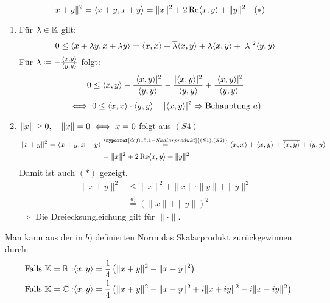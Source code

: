\begin{bemerkung*}
	\[ \| x + y \|^{2} = \langle x + y, x + y \rangle = \| x\|^{2} + 2 \mathop{\rm Re}\nolimits \langle x, y \rangle + \| y \|^{2} \quad (*) \label{eq:15.2-*} \]
\end{bemerkung*}

\begin{beweis}
	\begin{enumerate}[label=\alph*\upshape)]
		\item Für $\lambda \in \mathbb{K}$ gilt:
			\[ 0 \leq \langle x + \lambda y, x + \lambda y \rangle = \langle x, x \rangle + \overline{\lambda} \langle x, y \rangle + \lambda \langle x, y \rangle + |\lambda|^{2} \langle y, y \rangle \]
			Für $\lambda \coloneqq - \frac{\langle x, y \rangle}{\langle y, y \rangle}$ folgt:
			\[ 0 \leq \langle x, y \rangle - \frac{|\langle x,y \rangle|^{2}}{\langle y, y \rangle} - \frac{|\langle x, y \rangle|^{2}}{\langle y, y \rangle} + \frac{|\langle x, y \rangle|^{2}}{\langle y, y \rangle} \]
			\[ \iff 0 \leq \langle x, x \rangle \cdot \langle y, y \rangle - |\langle x, y \rangle|^{2} \Rightarrow \text{Behauptung } a) \]
		\item $\| x \| \geq 0, \quad \| x \| = 0 \iff x = 0$ folgt aus \hyperref[def:15.1iv]{$(S4)$} \\
			\begin{align*}
				\| x + y \|^{2} = \< x + y, x + y \> & \overset{\hyperref[def:15.1-Skalarprodukt]{(S1), (S2)}}{=} \< x, x \> + \< x, y \> + \overline{\< x, y \>} + \< y, y \> \\
						& = \| x \|^{2} + 2 \Re \< x, y \> + \| y \|^{2}
			\end{align*}
			Damit ist auch \hyperref[eq:15.2-*]{$(*)$} gezeigt.
			\begin{align*}
				\| x + y \|^{2} & \leq \| x \|^{2} + \| x \| \cdot \| y \| + \| y \|^{2} \\
						& \overset{\hyperref[prop:15.2a]{a)}}{=} \left( \| x \| + \| y \| \right)^{2}
			\end{align*}
			$\Rightarrow$ Die Dreiecksungleichung gilt für $\| \cdot \|$.
	\end{enumerate}	
\end{beweis}


\begin{bemerkung} \label{bem:15.3}
	Man kann aus der in \hyperref[prop:15.2b]{$b)$} definierten Norm das Skalarprodukt zurückgewinnen durch:
	\begin{align*}
		\text{Falls } \mathbb{K} = \mathbb{R}: &  \langle x, y \rangle = \frac{1}{4} \left( \| x + y \|^{2} - \| x - y \|^{2} \right) \\
		\text{Falls } \mathbb{K} = \mathbb{C}: &  \langle x, y \rangle = \frac{1}{4} \left( \| x + y \|^{2} - \| x - y \|^{2} + i \| x + i y\|^{2} - i \| x - iy\|^{2} \right)
	\end{align*}
\end{bemerkung}


